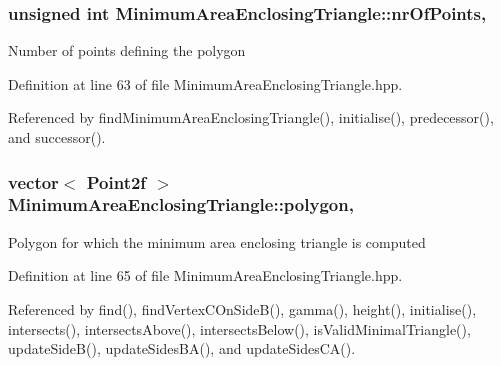 \hypertarget{classmultiscale_1_1MinimumAreaEnclosingTriangle_ae9024f754f845334dc9dd74ce8e104a9}{
\subsubsection[{nr\-Of\-Points}]{\setlength{\rightskip}{0pt plus 5cm}unsigned int Minimum\-Area\-Enclosing\-Triangle\-::nr\-Of\-Points\hspace{0.3cm}{\ttfamily [static]}, {\ttfamily [private]}}}\label{classmultiscale_1_1MinimumAreaEnclosingTriangle_ae9024f754f845334dc9dd74ce8e104a9}
Number of points defining the polygon 

Definition at line 63 of file Minimum\-Area\-Enclosing\-Triangle.\-hpp.



Referenced by find\-Minimum\-Area\-Enclosing\-Triangle(), initialise(), predecessor(), and successor().

\hypertarget{classmultiscale_1_1MinimumAreaEnclosingTriangle_ae00ebcf0a1f6bb966d9735a4be44a2f3}{
\subsubsection[{polygon}]{\setlength{\rightskip}{0pt plus 5cm}vector$<$ Point2f $>$ Minimum\-Area\-Enclosing\-Triangle\-::polygon\hspace{0.3cm}{\ttfamily [static]}, {\ttfamily [private]}}}\label{classmultiscale_1_1MinimumAreaEnclosingTriangle_ae00ebcf0a1f6bb966d9735a4be44a2f3}
Polygon for which the minimum area enclosing triangle is computed 

Definition at line 65 of file Minimum\-Area\-Enclosing\-Triangle.\-hpp.



Referenced by find(), find\-Vertex\-C\-On\-Side\-B(), gamma(), height(), initialise(), intersects(), intersects\-Above(), intersects\-Below(), is\-Valid\-Minimal\-Triangle(), update\-Side\-B(), update\-Sides\-B\-A(), and update\-Sides\-C\-A().


